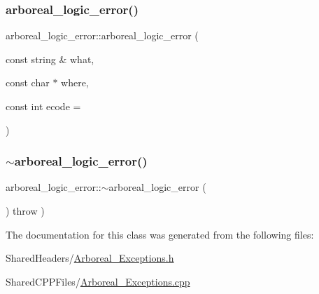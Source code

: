 \mbox{\label{classarboreal__logic__error_a5c589df18299902a24dae25f8a25c02a}} 
\subsubsection{\texorpdfstring{arboreal\+\_\+logic\+\_\+error()}{arboreal\_logic\_error()}\hspace{0.1cm}{\footnotesize\ttfamily [4/4]}}
{\footnotesize\ttfamily arboreal\+\_\+logic\+\_\+error\+::arboreal\+\_\+logic\+\_\+error (\begin{DoxyParamCaption}\item[{const string \&}]{what,  }\item[{const char $\ast$}]{where,  }\item[{const int}]{ecode = {} }\end{DoxyParamCaption})}

\mbox{\label{classarboreal__logic__error_aab22b59f9195e9cb7bc8e420c3426229}} 
\subsubsection{\texorpdfstring{$\sim$arboreal\+\_\+logic\+\_\+error()}{~arboreal\_logic\_error()}}
{\footnotesize\ttfamily arboreal\+\_\+logic\+\_\+error\+::$\sim$arboreal\+\_\+logic\+\_\+error (\begin{DoxyParamCaption}{ }\end{DoxyParamCaption}) throw  ) }



The documentation for this class was generated from the following files\+:\begin{DoxyCompactItemize}
\item 
Shared\+Headers/\mbox{\hyperlink{_arboreal___exceptions_8h}{Arboreal\+\_\+\+Exceptions.\+h}}\item 
Shared\+C\+P\+P\+Files/\mbox{\hyperlink{_arboreal___exceptions_8cpp}{Arboreal\+\_\+\+Exceptions.\+cpp}}\end{DoxyCompactItemize}
